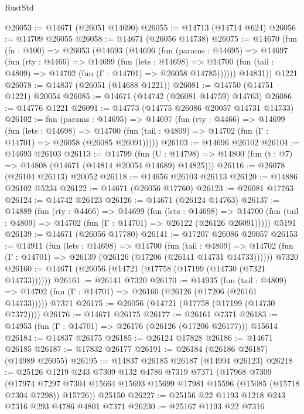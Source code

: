 \begin{lexlean}{RustStd}
\begin{coremodule}
@26053 := @14671 (@26051 @14690)
@26055 := @14713 (@14714 @624)
@26056 := @14709 @26055
@26058 := @14671 (@26056 @14738)
@26075 := @14670
    (fun (fn : @100) =>
    @26053
      (@14693
        (@14696
          (fun (params : @14695) =>
          @14697
            (fun (rty : @4466) =>
            @14699
              (fun (lets : @14698) =>
              @14700 (fun (tail : @4809) => @14702 (fun (Γ : @14701) => @26058 @14785))))))
        @14831))
    @1221
@26078 := @14837 (@26051 (@14688 @1221))
@26081 := @14750 (@14751 @1221) @20054
@26085 := @14671 (@14742 (@26081 @14759) @14763)
@26086 := @14776 @1221
@26091 := @14773 (@14775 @26086 @20057 @14731 @14733)
@26102 := fun (params : @14695) =>
  @14697
    (fun (rty : @4466) =>
    @14699
      (fun (lets : @14698) =>
      @14700 (fun (tail : @4809) => @14702 (fun (Γ : @14701) => @26058 (@26085 @26091)))))
@26103 := @14696 @26102
@26104 := @14693 @26103
@26113 := @14799
    (fun (U : @14798) => @14800 (fun (t : @7) => @14808 (@14671 (@14814 @20054 @14689) @14825)))
@26116 := @26078 (@26104 @26113) @20052
@26118 := @14656 @26103 @26113
@26120 := @14886 @26102 @5234
@26122 := @14671 (@26056 @17760)
@26123 := @26081 @17763
@26124 := @14742 @26123
@26126 := @14671 (@26124 @14763)
@26137 := @14889
    (fun (rty : @4466) =>
    @14699
      (fun (lets : @14698) =>
      @14700 (fun (tail : @4809) => @14702 (fun (Γ : @14701) => @26122 (@26126 @26091)))))
    @5191
@26139 := @14671 (@26056 @17780)
@26141 := @17207 @26086 @20057
@26153 := @14911
    (fun (lets : @14698) =>
    @14700
      (fun (tail : @4809) =>
      @14702 (fun (Γ : @14701) => @26139 (@26126 (@17206 (@26141 @14731 @14733))))))
    @7320
@26160 := @14671 (@26056 (@14721 (@17758 (@17199 (@14730 (@7321 @14733))))))
@26161 := @26141 @7320
@26170 := @14935
    (fun (tail : @4809) => @14702 (fun (Γ : @14701) => @26160 (@26126 (@17206 (@26161 @14733)))))
    @7371
@26175 := @26056 (@14721 (@17758 (@17199 (@14730 @7372))))
@26176 := @14671 @26175
@26177 := @26161 @7371
@26183 := @14953 (fun (Γ : @14701) => @26176 (@26126 (@17206 @26177))) @15614
@26184 := @14837 @26175
@26185 := @26124 @17828
@26186 := @14671 @26185
@26187 := @17832 @26177
@26191 := @26184 (@26186 @26187) (@14989 @26055)
@26195 := @14837 @26185 @26187 (@14994 @26123)
@26218 := @25126
    @1219
    @243
    @7309
    @132
    @4786
    @7319
    @7371
    (@17968
      @7309
      (@17974 @7297 @7304 @15664 @15693 @15699 @17981 @15596 (@15085 (@15718 @7304 @7298)) @15726))
    @25150
@26227 := @25156 @22 @1193 @1218 @243 @7316 @293 @4786 @4801 @7371
@26230 := @25167 @1193 @22 @7316

\end{coremodule}
\end{lexlean}
